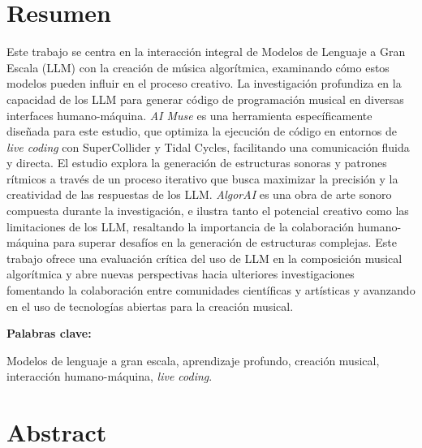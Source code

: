   \clearpage
  \chapter*{Resumen}

  Este trabajo se centra en la interacción integral de Modelos de Lenguaje a Gran Escala (LLM) con la creación de música algorítmica, examinando cómo estos modelos pueden influir en el proceso creativo. La investigación profundiza en la capacidad de los LLM para generar código de programación musical en diversas interfaces humano-máquina. \emph{AI Muse} es una herramienta específicamente diseñada para este estudio, que optimiza la ejecución de código en entornos de \emph{live coding} con SuperCollider y Tidal Cycles, facilitando una comunicación fluida y directa. El estudio explora la generación de estructuras sonoras y patrones rítmicos a través de un proceso iterativo que busca maximizar la precisión y la creatividad de las respuestas de los LLM. \emph{AlgorAI} es una obra de arte sonoro compuesta durante la investigación, e ilustra tanto el potencial creativo como las limitaciones de los LLM, resaltando la importancia de la colaboración humano-máquina para superar desafíos en la generación de estructuras complejas. Este trabajo ofrece una evaluación crítica del uso de LLM en la composición musical algorítmica y abre nuevas perspectivas hacia ulteriores investigaciones fomentando la colaboración entre comunidades científicas y artísticas y avanzando en el uso de tecnologías abiertas para la creación musical.

  \vspace{1cm}
  \textbf{Palabras clave:} %

  Modelos de lenguaje a gran escala, aprendizaje profundo, creación musical, interacción humano-máquina, \emph{live coding}.


    \clearpage
    \chapter*{Abstract}
  
